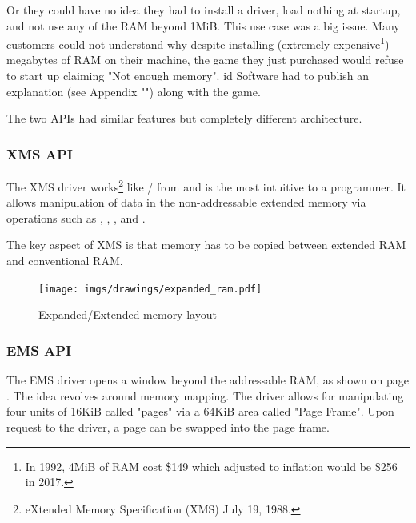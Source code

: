 \documentclass[book.tex]{subfiles}
\begin{document}
Or they could have no idea they had to install a driver, load nothing at startup, and not use any of the RAM beyond 1MiB. This use case was a big issue. Many customers could not understand why despite installing (extremely expensive\footnote{In 1992, 4MiB of RAM cost \$149 which adjusted to inflation would be \$256 in 2017.}) megabytes of RAM on their machine, the game they just purchased would refuse to start up claiming "Not enough memory". id Software had to publish an explanation (see Appendix "") along with the game.\\
\par

The two APIs had similar features but completely different architecture.\\
\par
\subsubsection{XMS API}
The XMS driver works\footnote{eXtended Memory Specification (XMS) July 19, 1988.} like / from  and is the most intuitive to a programmer. It allows manipulation of data in the non-addressable extended memory via operations such as , , , and .\\
\par
The key aspect of XMS is that memory has to be copied between extended RAM and conventional RAM.

\begin{figure}[H]
\centering
\texttt{[image: imgs/drawings/expanded\_ram.pdf]}
\caption{Expanded/Extended memory layout}
\label{fig:ems_xms_layout}
\end{figure}





\subsubsection{EMS API}
The EMS driver opens a window beyond the addressable RAM, as shown on page \pageref{fig:ems_xms_layout}. The idea revolves around memory mapping. The driver allows for manipulating four units of 16KiB called "pages" via a 64KiB area called "Page Frame". Upon request to the driver, a page can be swapped into the page frame.\\
\par
\end{document}

